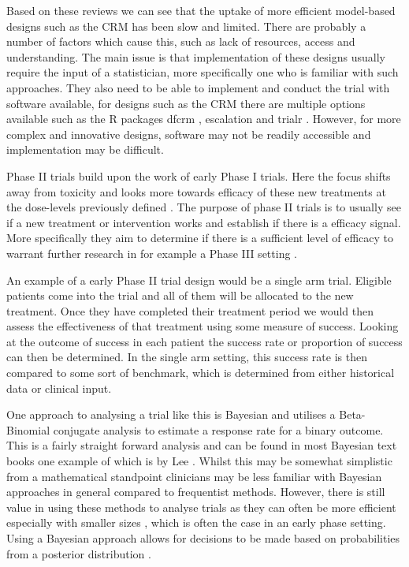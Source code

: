 Based on these reviews we can see that the uptake of more efficient model-based designs such as the CRM has been slow and limited. There are probably a number of factors which cause this, such as lack of resources, access and understanding. The main issue is that implementation of these designs usually require the input of a statistician, more specifically one who is familiar with such approaches. They also need to be able to implement and conduct the trial with software available, for designs such as the CRM there are multiple options available such as the R packages dfcrm \cite{cheungDfcrmDoseFindingContinual2019}, escalation \cite{brockModularApproachDose2020} and trialr \cite{brockTrialrClinicalTrial2023}. However, for more complex and innovative designs, software may not be readily accessible and implementation may be difficult.

Phase \RN{2} trials build upon the work of early Phase \RN{1} trials. Here the focus shifts away from toxicity and looks more towards efficacy of these new treatments at the dose-levels previously defined \cite{berryBayesianAdaptiveMethods2010}. The purpose of phase \RN{2} trials is to usually see if a new treatment or intervention works and establish if there is a efficacy signal. More specifically they aim to determine if there is a sufficient level of efficacy to warrant further research in for example a Phase \RN{3} setting \cite{juliousIntroductionStatisticsEarly2010}.

An example of a early Phase \RN{2} trial design would be a single arm trial. Eligible patients come into the trial 
and all of them will be allocated to the new treatment. Once they have completed their treatment period we would then assess
the effectiveness of that treatment using some measure of success. Looking at the outcome of success in each patient the 
success rate or proportion of success can then be determined. In the single arm setting, this success rate is then compared to
some sort of benchmark, which is determined from either historical data or clinical input.

One approach to analysing a trial like this is Bayesian and utilises a Beta-Binomial conjugate analysis to estimate a response rate for a binary outcome. This is a fairly straight forward analysis and can be found in most Bayesian text books one example of which is by Lee \cite{leeBayesianStatisticsIntroduction2012}. Whilst this may be somewhat simplistic from a mathematical standpoint clinicians may be less familiar with Bayesian approaches in general compared to frequentist methods. However, there is still value in using these methods to analyse trials as they can often be more efficient especially with smaller sizes \cite{inoueRelationshipBayesianFrequentist2005}, which is often the case in an early phase setting. Using a Bayesian approach allows for decisions to be made based on probabilities from a posterior distribution \cite{savilleUtilityBayesianPredictive2014}.  

